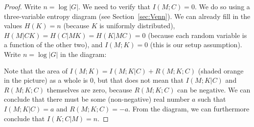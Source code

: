 \begin{proof}
Write $n = \log|G|$. We need to verify that $I(M;C) = 0$. We do so using a three-variable entropy diagram (see Section~\ref{sec:Venn}). We can already fill in the values $H(K) = n$ (because $K$ is uniformly distributed), $H(M|CK) = H(C|MK) = H(K|MC) = 0$ (because each random variable is a function of the other two), and $I(M;K) = 0$ (this is our setup assumption). Write $n = \log|G|$ in the diagram:

\begin{center}
\end{center}
Note that the area of $I(M;K) = I(M;K|C) + R(M;K;C)$ (shaded orange in the picture) as a whole is 0, but that does not mean that $I(M;K|C)$ and $R(M;K;C)$ themselves are zero, because $R(M;K;C)$ can be negative. We can conclude that there must be some (non-negative) real number $a$ such that $I(M;K|C) = a$ and $R(M;K;C) = -a$. From the diagram, we can furthermore conclude that $I(K;C|M) = n$.


\end{proof}
